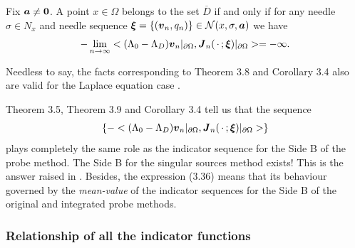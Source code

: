   Fix $\mbox{\boldmath $a$}\not=\mbox{\boldmath $0$}$.
A point $x\in\Omega$ belongs to the set $\overline{D}$ if and only if
for any needle $\sigma\in N_x$ and needle sequence $\mbox{\boldmath $\xi$}
=\{(\mbox{\boldmath $v$}_n,q_n)\}\in
{\cal N}(x,\sigma,\mbox{\boldmath $a$})$
we have
$$\displaystyle
-\lim_{n\rightarrow\infty}
<(\Lambda_0-\Lambda_D)\mbox{\boldmath $v$}_n\vert_{\partial\Omega},
\mbox{\boldmath $J$}_n(\,\cdot\,;\mbox{\boldmath $\xi$})\vert_{\partial\Omega}>
=-\infty.
$$
\endproclaim


\noindent
Needless to say, the facts corresponding to Theorem 3.8 and Corollary 3.4 also are valid
for the Laplace equation case \cite{IPS}.




Theorem 3.5, Theorem 3.9 and Corollary 3.4 tell us that the sequence
$$\displaystyle
\{-<(\Lambda_0-\Lambda_D)\mbox{\boldmath $v$}_n\vert_{\partial\Omega},
\mbox{\boldmath $J$}_n(\,\cdot\,;\mbox{\boldmath $\xi$})\vert_{\partial\Omega}>\}
$$
plays completely the same role as the indicator sequence for the Side B  of the probe method.
The Side B for the singular sources method exists!  This is the answer raised in \cite{IPS}.
Besides, the expression (3.36) means that its behaviour governed by the {\it mean-value} of
the indicator sequences for the Side B of the original and integrated probe methods.















































\subsubsection{Relationship of all the indicator functions}

